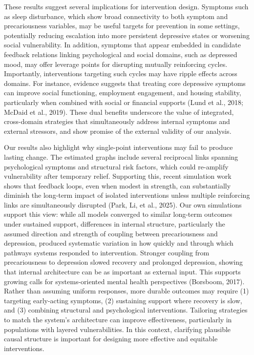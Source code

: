 \documentclass[
]{article}
\begin{document}
\textcolor{BrickRed}{These results suggest several implications for intervention design. Symptoms such as sleep disturbance, which show broad connectivity to both symptom and precariousness variables, may be useful targets for prevention in some settings, potentially reducing escalation into more persistent depressive states or worsening social vulnerability. In addition, symptoms that appear embedded in candidate feedback relations linking psychological and social domains, such as depressed mood, may offer leverage points for disrupting mutually reinforcing cycles.}
Importantly, interventions targeting such cycles may have ripple effects
across domains. For instance, evidence suggests that treating core
depressive symptoms can improve social functioning, employment
engagement, and housing stability, particularly when combined with
social or financial supports (Lund et al., 2018; McDaid et al., 2019).
These dual benefits underscore the value of integrated, cross-domain
strategies that simultaneously address internal symptoms and external
stressors, and show promise of the external validity of our analysis.

\textcolor{BrickRed}{Our results also highlight why single-point interventions may fail to produce lasting change. The estimated graphs include several reciprocal links spanning psychological symptoms and structural risk factors, which could re-amplify vulnerability after temporary relief.}
Supporting this, recent simulation work shows that feedback loops, even
when modest in strength, can substantially diminish the long-term impact
of isolated interventions unless multiple reinforcing links are
simultaneously disrupted (Park, Li, et al., 2025). Our own simulations
support this view: while all models converged to similar long-term
outcomes under sustained support,
\textcolor{BrickRed}{differences in internal structure, particularly the assumed direction and strength of coupling between precariousness and depression, produced systematic variation in how quickly and through which pathways systems responded to intervention.}
Stronger coupling from precariousness to depression slowed recovery and
prolonged depression, showing that internal architecture can be as
important as external input. This supports growing calls for
systems-oriented mental health perspectives (Borsboom, 2017). Rather
than assuming uniform responses, more durable outcomes may require (1)
targeting early-acting symptoms, (2) sustaining support where recovery
is slow, and (3) combining structural and psychological interventions.
Tailoring strategies to match the system's architecture can improve
effectiveness, particularly in populations with layered vulnerabilities.
\textcolor{BrickRed}{In this context, clarifying plausible causal structure is important for designing more effective and equitable interventions.}
\end{document}
